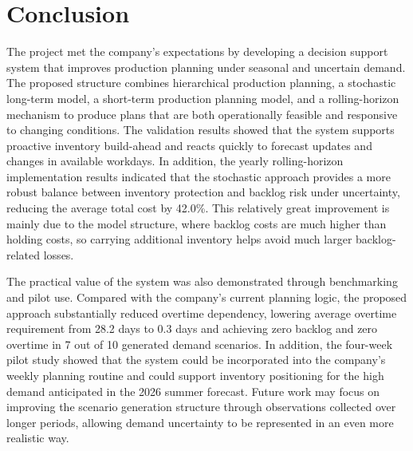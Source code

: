 \documentclass[nocoverpage]{buIE47xbooklet}
\begin{document}
\section{Conclusion}
The project met the company’s expectations by developing a decision support system that improves production planning under seasonal and uncertain demand. The proposed structure combines hierarchical production planning, a stochastic long-term model, a short-term production planning model, and a rolling-horizon mechanism to produce plans that are both operationally feasible and responsive to changing conditions. The validation results showed that the system supports proactive inventory build-ahead and reacts quickly to forecast updates and changes in available workdays. In addition, the yearly rolling-horizon implementation results indicated that the stochastic approach provides a more robust balance between inventory protection and backlog risk under uncertainty, reducing the average total cost by 42.0\%. This relatively great improvement is mainly due to the model structure, where backlog costs are much higher than holding costs, so carrying additional inventory helps avoid much larger backlog-related losses.

The practical value of the system was also demonstrated through benchmarking and pilot use. Compared with the company’s current planning logic, the proposed approach substantially reduced overtime dependency, lowering average overtime requirement from 28.2 days to 0.3 days and achieving zero backlog and zero overtime in 7 out of 10 generated demand scenarios. In addition, the four-week pilot study showed that the system could be incorporated into the company’s weekly planning routine and could support inventory positioning for the high demand anticipated in the 2026 summer forecast. Future work may focus on improving the scenario generation structure through observations collected over longer periods, allowing demand uncertainty to be represented in an even more realistic way.





\appendix
\end{document}
